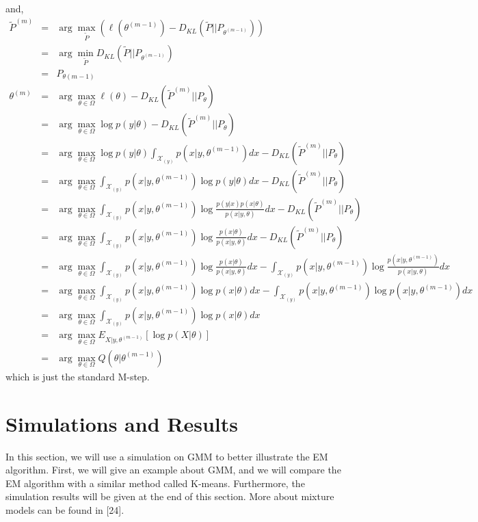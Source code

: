 \documentclass[onecolumn,12pt]{IEEEtran}
\begin{document}
and,
\begin{eqnarray}
  \tilde{P}^{(m)} & = & \arg\max_{\tilde{P}}(\ell(\theta^{(m-1)}) - D_{KL}(\tilde{P}||P_{\theta^{(m-1)}})) \nonumber\\
  & = & \arg\min_{\tilde{P}} D_{KL}(\tilde{P}||P_{\theta^{(m-1)}}) \nonumber\\
  & = & P_{\theta(m-1)} \nonumber \\
  \theta^{(m)} & = & \arg\max_{\theta\in \Omega} \ell(\theta) - D_{KL}(\tilde{P}^{(m)}||P_{\theta}) \nonumber \\
  & = & \arg\max_{\theta\in \Omega} \log p(y|\theta) - D_{KL}(\tilde{P}^{(m)}||P_{\theta}) \nonumber \\
  & = & \arg\max_{\theta\in \Omega} \log p(y|\theta) \int_{\mathcal{X}_{(y)}} p(x|y,\theta^{(m-1)})dx - D_{KL}(\tilde{P}^{(m)}||P_{\theta}) \nonumber \\
  & = & \arg\max_{\theta\in \Omega} \int_{\mathcal{X}_{(y)}} p(x|y,\theta^{(m-1)})\log p(y|\theta) dx - D_{KL}(\tilde{P}^{(m)}||P_{\theta}) \nonumber \\
  & = & \arg\max_{\theta\in \Omega} \int_{\mathcal{X}_{(y)}} p(x|y,\theta^{(m-1)})\log \frac{p(y|x)p(x|\theta)}{p(x|y,\theta)} dx - D_{KL}(\tilde{P}^{(m)}||P_{\theta}) \nonumber \\
  & = & \arg\max_{\theta\in \Omega} \int_{\mathcal{X}_{(y)}} p(x|y,\theta^{(m-1)})\log \frac{p(x|\theta)}{p(x|y,\theta)} dx - D_{KL}(\tilde{P}^{(m)}||P_{\theta}) \nonumber \\
  & = & \arg\max_{\theta\in \Omega} \int_{\mathcal{X}_{(y)}} p(x|y,\theta^{(m-1)})\log \frac{p(x|\theta)}{p(x|y,\theta)} dx -\int_{\mathcal{X}_{(y)}} p(x|y,\theta^{(m-1)})\log \frac{p(x|y,\theta^{(m-1)})}{p(x|y,\theta)}dx \nonumber \\
  & = & \arg\max_{\theta\in \Omega} \int_{\mathcal{X}_{(y)}} p(x|y,\theta^{(m-1)})\log p(x|\theta)dx - \int_{\mathcal{X}_{(y)}} p(x|y,\theta^{(m-1)})\log p(x|y,\theta^{(m-1)})dx \nonumber \\
  & = & \arg\max_{\theta\in \Omega} \int_{\mathcal{X}_{(y)}} p(x|y,\theta^{(m-1)})\log p(x|\theta)dx \nonumber \\
  & = & \arg\max_{\theta\in \Omega} E_{X|y,\theta^{(m-1)}}[\log p(X|\theta)] \nonumber \\
  & = & \arg\max_{\theta\in \Omega} Q(\theta|\theta^{(m-1)})
\end{eqnarray}
which is just the standard M-step.

\section{Simulations and Results}
In this section, we will use a simulation on GMM to better illustrate the EM algorithm. First, we will give an example about GMM, and we will compare the EM algorithm with a similar method called K-means. Furthermore, the simulation results will be given at the end of this section. More about mixture models can be found in [24].
\end{document}
